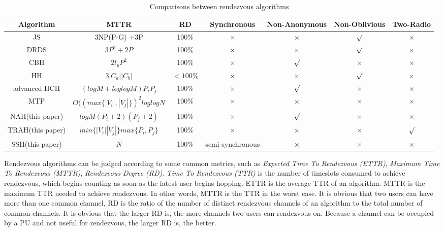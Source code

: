 \documentclass[10pt, conference, letterpaper]{IEEEtran}
\begin{document}
\begin{table}[!t]
\renewcommand{\arraystretch}{1.3}
 \caption{\upshape Comparisons between rendezvous algorithms }
\centering
\begin{tabular}{|c|c|c|c|c|c|c|}
\hline
Algorithm & MTTR & RD & Synchronous & Non-Anonymous &Non-Oblivious & Two-Radio\\
\hline
JS & 3NP(P-G) +3P & 100\% & $ \times$ & $ \times $ & $ \surd$ & $\times$\\
\hline
DRDS & $3P^2 + 2P$ & 100\% &$\times$ &$\times$ &$\surd$ & $\times$\\
\hline
CBH & $2l_pP^2$ & 100\% & $\times$ & $\surd$ & $\times$ & $\times$\\
\hline
HH & $3|C_a||C_b|$ &$ <100\%$ &$\times$ &$\times$& $\surd $ &$\times$\\
\hline
advanced HCH & $(log M + loglog M)P_iP_j$ & 100\% & $\times$ &$\surd$ &$\times$ &$\times$\\
\hline
MTP & $O((max\{|V_i|,|V_j|\})^2loglog N$ & 100\%& $\times$ & $\times$ & $\times$ &$\times$\\
\hline
NAH(this paper) & $log M (P_i + 2)(P_j +2)$ & 100\% &$\times $ & $\surd$ & $\times$ & $\times$\\
\hline
TRAH(this paper) & $min\{|V_i||V_j|\}max\{P_i,P_j\}$ &100\% &$\times $ & $\times$ & $\times$ &$\surd$\\
\hline
SSH(this paper) & $N$ & 100\% & semi-synchronous &$\times$ &$\times $ & $\times$ \\
\hline
\end{tabular}
\end{table}


Rendezvous algorithms can be judged according to some common metrics, such as \emph{Expected Time To Rendezvous (ETTR)}, \emph{Maximum Time To Rendezvous (MTTR)}, \emph{Rendezvous Degree (RD)}. \emph{Time To Rendezvous (TTR)} is the number of timeslots consumed to achieve rendezvous, which begins counting as soon as the latest user begins hopping. ETTR is the average TTR of an algorithm. MTTR is the maximum TTR needed to achieve rendezvous. In other words, MTTR is the TTR in the worst case. It is obvious that two users can have more than one common channel, RD is the ratio of the number of distinct rendezvous channels of an algorithm to the total number of common channels. It is obvious that the larger RD is, the more channels two users can rendezvous on. Because a channel can be occupied by a PU and not useful for rendezvous, the larger RD is, the better.
\end{document}
